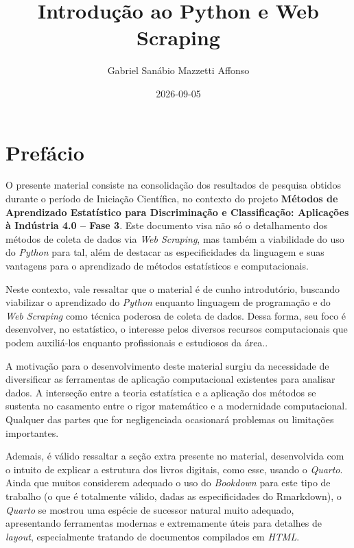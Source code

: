 \documentclass[
  brazilian,
  letterpaper,
  DIV=11,
  numbers=noendperiod]{scrreprt}
\title{Introdução ao Python e Web Scraping}
\author{Gabriel Sanábio Mazzetti Affonso}
\date{2026-09-05}
\renewcommand*\contentsname{Índice}
\newcommand\contentsname{Índice}
\begin{document}
\maketitle

\renewcommand*\contentsname{Índice}
{
\hypersetup{linkcolor=}
\setcounter{tocdepth}{2}
\tableofcontents
}


\chapter*{Prefácio}\label{prefuxe1cio}


O presente material consiste na consolidação dos resultados de pesquisa
obtidos durante o período de Iniciação Científica, no contexto do
projeto \textbf{Métodos de Aprendizado Estatístico para Discriminação e
Classificação: Aplicações à Indústria 4.0 -- Fase 3}. Este documento
visa não só o detalhamento dos métodos de coleta de dados via \emph{Web
Scraping}, mas também a viabilidade do uso do \emph{Python} para tal,
além de destacar as especificidades da linguagem e suas vantagens para o
aprendizado de métodos estatísticos e computacionais.

Neste contexto, vale ressaltar que o material é de cunho introdutório,
buscando viabilizar o aprendizado do \emph{Python} enquanto linguagem de
programação e do \emph{Web Scraping} como técnica poderosa de coleta de
dados. Dessa forma, seu foco é desenvolver, no estatístico, o interesse
pelos diversos recursos computacionais que podem auxiliá-los enquanto
profissionais e estudiosos da área..

A motivação para o desenvolvimento deste material surgiu da necessidade
de diversificar as ferramentas de aplicação computacional existentes
para analisar dados. A interseção entre a teoria estatística e a
aplicação dos métodos se sustenta no casamento entre o rigor matemático
e a modernidade computacional. Qualquer das partes que for negligenciada
ocasionará problemas ou limitações importantes.

Ademais, é válido ressaltar a seção extra presente no material,
desenvolvida com o intuito de explicar a estrutura dos livros digitais,
como esse, usando o \emph{Quarto}. Ainda que muitos considerem adequado
o uso do \emph{Bookdown} para este tipo de trabalho (o que é totalmente
válido, dadas as especificidades do Rmarkdown), o \emph{Quarto} se
mostrou uma espécie de sucessor natural muito adequado, apresentando
ferramentas modernas e extremamente úteis para detalhes de
\emph{layout}, especialmente tratando de documentos compilados em
\emph{HTML}.
\end{document}
